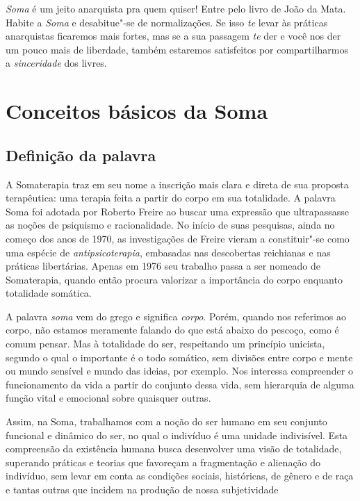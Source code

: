 \emph{Soma} é um jeito anarquista pra quem quiser! Entre pelo livro de
João da Mata. Habite a \emph{Soma} e desabitue"-se de normalizações. Se
isso \emph{te} levar às práticas anarquistas ficaremos mais fortes, mas
se a sua passagem \emph{te} der e você nos der um pouco mais de
liberdade, também estaremos satisfeitos por compartilharmos a
\emph{sinceridade} dos livres.

\chapter*{Conceitos básicos da Soma}

\section{Definição da palavra }

A Somaterapia traz em seu nome a inscrição mais clara e direta de sua
proposta terapêutica: uma terapia feita a partir do corpo em sua
totalidade. A palavra Soma foi adotada por Roberto Freire ao buscar uma
expressão que ultrapassasse as noções de psiquismo e racionalidade. No
início de suas pesquisas, ainda no começo dos anos de 1970, as investigações de
Freire vieram a constituir"-se como uma espécie de
\emph{antipsicoterapia}, embasadas nas descobertas reichianas e nas
práticas libertárias. Apenas em 1976 seu trabalho passa a ser nomeado de
Somaterapia, quando então procura valorizar a importância do corpo
enquanto totalidade somática.

A palavra \emph{soma} vem do grego e significa \emph{corpo}. Porém,
quando nos referimos ao corpo, não estamos meramente falando do que está
abaixo do pescoço, como é comum pensar. Mas à totalidade do ser,
respeitando um princípio unicista, segundo o qual o importante é o
todo somático, sem divisões entre corpo e mente ou mundo sensível e
mundo das ideias, por exemplo. Nos interessa compreender o funcionamento
da vida a partir do conjunto dessa vida, sem hierarquia de alguma função
vital e emocional sobre quaisquer outras.

Assim, na Soma, trabalhamos com a noção do ser humano em seu conjunto
funcional e dinâmico do ser, no qual o indivíduo é uma unidade
indivisível. Esta compreensão da existência humana busca desenvolver uma
visão de totalidade, superando práticas e teorias que favoreçam a
fragmentação e alienação do indivíduo, sem levar em conta as condições
sociais, históricas, de gênero e de raça e tantas outras que incidem na
produção de nossa subjetividade

